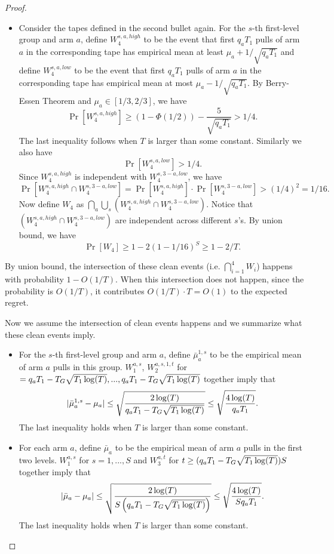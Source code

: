 \begin{proof}
\begin{itemize}
\item Consider the tapes defined in the second bullet again. For the $s$-th first-level group and arm $a$, define $W_4^{s,a,high}$  to be the event that first $q_a T_1$ pulls of arm $a$ in the corresponding tape has empirical mean at least $\mu_a + 1/\sqrt{q_a T_1}$ and define  $W_4^{s,a,low}$  to be the event that first $q_a T_1$ pulls of arm $a$ in the corresponding tape has empirical mean at most $\mu_a - 1/\sqrt{q_a T_1}$. By Berry-Essen Theorem and $\mu_a \in [1/3,2/3]$, we have
\[
\Pr[W_4^{s,a,high}] \geq (1-\Phi(1/2)) - \frac{5}{\sqrt{q_aT_1}} > 1/4.
\]
The last inequality follows when $T$ is larger than some constant.
Similarly we also have 
\[
\Pr[W_4^{s,a,low}] > 1/4.
\]
Since $W_4^{s,a,high}$ is independent with $W_4^{s,3-a,low}$, we have
\[
\Pr[W_4^{s,a,high} \cap W_4^{s,3-a,low}] =\Pr[W_4^{s,a,high}] \cdot  \Pr[W_4^{s,3-a,low}]>(1/4)^2 = 1/16.
\]
Now define $W_4$ as $\bigcap_a \bigcup_s (W_4^{s,a,high} \cap W_4^{s,3-a,low})$. Notice that $(W_4^{s,a,high} \cap W_4^{s,3-a,low})$ are independent across different $s$'s. By union bound, we have
\[
\Pr[W_4] \geq 1- 2(1-1/16)^S \geq 1 -2 /T.
\]
\end{itemize}

By union bound, the intersection of these clean events (i.e. $\bigcap_{i=1}^4 W_i$) happens with probability $1-O(1/T)$. When this intersection does not happen, since the probability is $O(1/T)$, it contributes $O(1/T) \cdot T = O(1)$ to the expected regret. 

Now we assume the intersection of clean events happens and we summarize what these clean events imply.

\begin{itemize}
\item For the $s$-th first-level group and arm $a$, define $\bar{\mu}_a^{1,s}$ to be the empirical mean of arm $a$ pulls in this group. $W_1^{a,s}$, $W_2^{a,s,1,t}$ for $ = q_a T_1- T_G \sqrt{T_1\log(T)},...,q_a T_1- T_G \sqrt{T_1\log(T)}$ together imply that
\[
|\bar{\mu}_a^{1,s} - \mu_a| \leq \sqrt{\frac{2\log(T)}{q_a T_1- T_G \sqrt{T_1\log(T)}}} \leq \sqrt{\frac{4\log(T)}{q_a T_1}}.
\]
The last inequality holds when $T$ is larger than some constant.
\item For each arm $a$, define $\bar{\mu}_a$ to be the empirical mean of arm $a$ pulls in the first two levels. $W_1^{a,s}$ for $s=1,...,S$ and $W_3^{a,t}$ for $t \geq  (q_a T_1- T_G \sqrt{T_1\log(T)})S$ together imply that
\[
|\bar{\mu}_a - \mu_a| \leq \sqrt{\frac{2\log(T)}{S\left(q_a T_1- T_G \sqrt{T_1\log(T)}\right)}} \leq \sqrt{\frac{4\log(T)}{S q_a T_1}} .
\]
The last inequality holds when $T$ is larger than some constant.


\end{itemize}
\end{proof}
